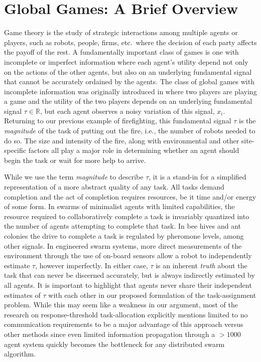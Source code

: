 \documentclass[conference]{ieeeconf}
\begin{document}
\section{Global Games: A Brief Overview}\label{sec:ggoverview}
Game theory is the study of strategic interactions among multiple agents or players, such as robots, people, firms, etc.\ where the decision of each party affects the payoff of the rest. A fundamentally important class of games is one with incomplete or imperfect information where each agent's utility depend not only on the actions of the other agents, but also on an underlying fundamental signal that cannot be accurately ordained by the agents. The class of global games with incomplete information was originally introduced in \cite{Carlsson1993} where two players are playing a game and the utility of the two players depends on an underlying fundamental signal $\tau \in \mathbb{R}$, but each agent observes a noisy variation of this signal, $x_i$. Returning to our previous example of firefighting, this fundamental signal $\tau$ is the \emph{magnitude} of the task of putting out the fire, i.e., the number of robots needed to do so. The size and intensity of the fire, along with environmental and other site-specific factors all play a major role in determining whether an agent should begin the task or wait for more help to arrive.

While we use the term \emph{magnitude} to describe $\tau$, it is a stand-in for a simplified representation of a more abstract quality of any task. All tasks demand completion and the act of completion requires resources, be it time and/or energy of some form. In swarms of minimalist agents with limited capabilities, the resource required to collaboratively complete a task is invariably quantized into the number of agents attempting to complete that task.
In bee hives and ant colonies the drive to complete a task is regulated by pheromone levels, among other signals.  In engineered swarm systems, more direct measurements of the environment through the use of on-board sensors allow a robot to independently estimate $\tau$, however imperfectly. In either case, $\tau$ is an inherent \emph{truth} about the task that can never be discerned accurately, but is always indirectly estimated by all agents. It is important to highlight that agents never share their independent estimates of $\tau$ with each other in our proposed formulation of the task-assignment problem. While this may seem like a weakness in our argument, most of the research on response-threshold task-allocation explicitly mentions limited to no communication requirements to be a major advantage of this approach versus other methods since even limited information propagation through a $>1000$ agent system quickly becomes the bottleneck for any distributed swarm algorithm.
\end{document}
